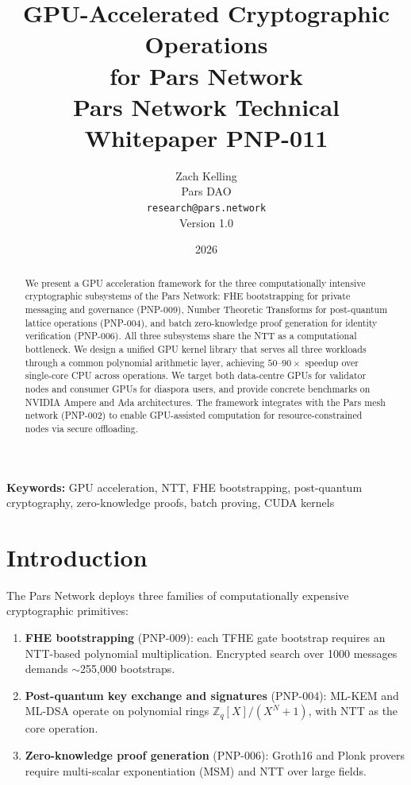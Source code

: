 \documentclass[11pt,a4paper]{article}
\title{%
    \textbf{GPU-Accelerated Cryptographic Operations\\
    for Pars Network}\\[0.5em]
    \large Pars Network Technical Whitepaper PNP-011
}
\author{%
    Zach Kelling\\
    Pars DAO\\
    \texttt{research@pars.network}\\[0.5em]
    \small Version 1.0
}
\date{2026}
\begin{document}
\parscoverpage

\thispagestyle{fancy}

\begin{abstract}
\noindent
We present a GPU acceleration framework for the three computationally
intensive cryptographic subsystems of the Pars Network: FHE bootstrapping
for private messaging and governance (PNP-009), Number Theoretic
Transforms for post-quantum lattice operations (PNP-004), and batch
zero-knowledge proof generation for identity verification (PNP-006).
All three subsystems share the NTT as a computational bottleneck.  We
design a unified GPU kernel library that serves all three workloads
through a common polynomial arithmetic layer, achieving $50$--$90\times$
speedup over single-core CPU across operations.  We target both
data-centre GPUs for validator nodes and consumer GPUs for diaspora
users, and provide concrete benchmarks on NVIDIA Ampere and Ada
architectures.  The framework integrates with the Pars mesh network
(PNP-002) to enable GPU-assisted computation for resource-constrained
nodes via secure offloading.
\end{abstract}

\vspace{1em}
\noindent\textbf{Keywords:} GPU acceleration, NTT, FHE bootstrapping,
post-quantum cryptography, zero-knowledge proofs, batch proving,
CUDA kernels

\tableofcontents
\newpage

\section{Introduction}
\label{sec:intro}

The Pars Network deploys three families of computationally expensive
cryptographic primitives:

\begin{enumerate}
    \item \textbf{FHE bootstrapping} (PNP-009): each TFHE gate bootstrap
    requires an NTT-based polynomial multiplication.  Encrypted search
    over 1000 messages demands $\sim$255{,}000 bootstraps.
    \item \textbf{Post-quantum key exchange and signatures} (PNP-004):
    ML-KEM and ML-DSA operate on polynomial rings $\mathbb{Z}_q[X]/(X^N+1)$,
    with NTT as the core operation.
    \item \textbf{Zero-knowledge proof generation} (PNP-006): Groth16
    and Plonk provers require multi-scalar exponentiation (MSM) and
    NTT over large fields.
\end{enumerate}
\end{document}

